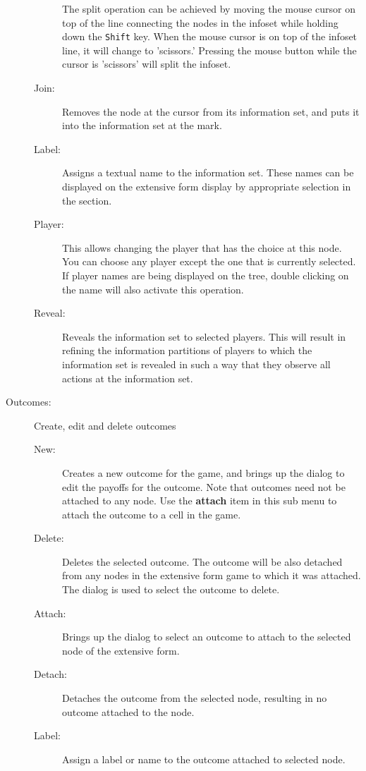 \begin{description}
\begin{description}
 The split operation can be
achieved by moving the mouse cursor on top of the line connecting the
nodes in the infoset while holding down the {\tt Shift} key.  When the
mouse cursor is on top of the infoset line, it will change to
'scissors.'  Pressing the mouse button while the cursor is 'scissors'
will split the infoset.
\item[Join:] Removes the node at the cursor from its information set,
and puts it into the information set at the mark.
\item[Label:] Assigns a textual name to the information set.  These
names can be displayed on the extensive form display by appropriate
selection in the \helpref{}{} section. 
\item[Player:] This allows changing the player that has the choice at
this node.  You can choose any player except the one that is currently
selected.  If player names are being displayed on the tree, double
clicking on the name will also activate this operation.
\item[Reveal:] Reveals the information set to selected players.  This
will result in refining the information partitions of players to which
the information set is revealed in such a way that they observe all
actions at the information set.
\end{description}
\item[Outcomes:] Create, edit and delete outcomes
\begin{description}
\item[New:] Creates a new outcome for the game, and brings up the 
 dialog to edit the payoffs for
the outcome.  Note that outcomes need not be attached to any node.
Use the {\bf attach} item in this sub menu to attach the outcome to a
cell in the game. 
\item[Delete:] Deletes the selected outcome.  The outcome will be also
detached from any nodes in the extensive form game to which it was
attached. The  dialog is used
to select the outcome to delete.
\item[Attach:] Brings up the  
dialog to select an outcome to attach to the selected node of the
extensive form.
\item[Detach:] Detaches the outcome from the selected node, resulting
in no outcome attached to the node.
\item[Label:] Assign a label or name to the outcome attached to
selected node.

\end{description}
\end{description}
